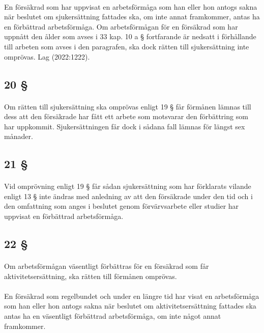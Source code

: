 \documentclass[a4paper,notitlepage,openany,10pt]{book}
\begin{document}
\paragraph*{}
En försäkrad som har uppvisat en arbetsförmåga som han eller hon antogs sakna när beslutet om sjukersättning fattades ska, om inte annat framkommer, antas ha en förbättrad arbetsförmåga. Om arbetsförmågan för en försäkrad som har uppnått den ålder som avses i 33 kap. 10 a § fortfarande är nedsatt i förhållande till arbeten som avses i den paragrafen, ska dock rätten till sjukersättning inte omprövas.
Lag (2022:1222).
\subsection*{20 §}
\paragraph*{}
Om rätten till sjukersättning ska omprövas enligt 19 § får förmånen lämnas till dess att den försäkrade har fått ett arbete som motsvarar den förbättring som har uppkommit.
Sjukersättningen får dock i sådana fall lämnas för längst sex månader.
\subsection*{21 §}
\paragraph*{}
Vid omprövning enligt 19 § får sådan sjukersättning som har förklarats vilande enligt 13 § inte ändras med anledning av att den försäkrade under den tid och i den omfattning som anges i beslutet genom förvärvsarbete eller studier har uppvisat en förbättrad arbetsförmåga.
\subsection*{22 §}
\paragraph*{}
Om arbetsförmågan väsentligt förbättras för en försäkrad som får aktivitetsersättning, ska rätten till förmånen omprövas.
\paragraph*{}
En försäkrad som regelbundet och under en längre tid har visat en arbetsförmåga som han eller hon antogs sakna när beslutet om aktivitetsersättning fattades ska antas ha en väsentligt förbättrad arbetsförmåga, om inte något annat framkommer.
\end{document}
